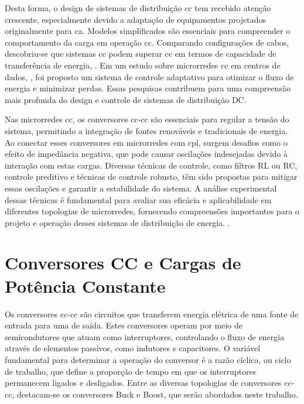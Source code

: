 Desta forma, o design de sistemas de distribuição \acrshort{cc} tem recebido atenção crescente, especialmente devido a adaptação de equipamentos projetados originalmente para \acrshort{ca}. Modelos simplificados são essenciais para compreender o comportamento da carga em operação \acrshort{cc}. Comparando configurações de cabos, descobriu-se que sistemas \acrshort{cc} podem superar \acrshort{cc} em termos de capacidade de transferência de energia, \cite{Salomonsson2007}. Em um estudo sobre microrredes \acrshort{cc} em centros de dados, \cite{Salomonsson2008}, foi proposto um sistema de controle adaptativo para otimizar o fluxo de energia e minimizar perdas. Essas pesquisas contribuem para uma compreensão mais profunda do design e controle de sistemas de distribuição DC.

Nas microrredes \acrshort{cc}, os conversores \acrshort{cc}-\acrshort{cc} são essenciais para regular a tensão do sistema, permitindo a integração de fontes renováveis e tradicionais de energia. Ao conectar esses conversores em microrredes com \acrfull{cpl}, surgem desafios como o efeito de impedância negativa, que pode causar oscilações indesejadas devido à interação com estas cargas. Diversas técnicas de controle, como filtros RL ou RC, controle preditivo e técnicas de controle robusto, têm sido propostas para mitigar essas oscilações e garantir a estabilidade do sistema. A análise experimental dessas técnicas é fundamental para avaliar sua eficácia e aplicabilidade em diferentes topologias de microrredes, fornecendo compreensões importantes para o projeto e operação desses sistemas de distribuição de energia. \cite{Bessa2020}.

\section{Conversores CC e Cargas de Potência Constante}

Os conversores \acrshort{cc}-\acrshort{cc} são circuitos que transferem energia elétrica de uma fonte de entrada para uma de saída. Estes conversores operam por meio de semicondutores que atuam como interruptores, controlando o fluxo de energia através de elementos passivos, como indutores e capacitores. O variável fundamental para determinar a operação do conversor é a razão cíclica, ou ciclo de trabalho, que define a proporção de tempo em que os interruptores permanecem ligados e desligados. Entre as diversas topologias de conversores \acrshort{cc}-\acrshort{cc}, destacam-se os conversores Buck e Boost, que serão abordados neste trabalho.

